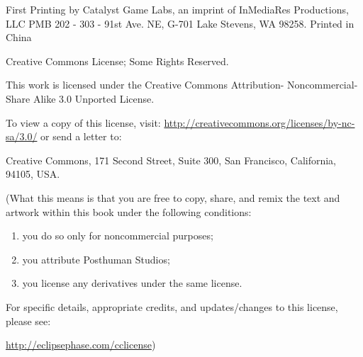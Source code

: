 First Printing by Catalyst Game Labs, an imprint of InMediaRes Productions, LLC PMB 202 - 303 - 91st Ave. NE, G-701 Lake Stevens, WA 98258. Printed in China 

Creative Commons License; Some Rights Reserved. 

This work is licensed under the Creative Commons Attribution- Noncommercial-Share Alike 3.0 Unported License. 

To view a copy of this license, visit: \url{http://creativecommons.org/licenses/by-nc-sa/3.0/}{} or send a letter to: 

\begin{center} Creative Commons, 171 Second Street, Suite 300, San Francisco, California, 94105, USA. \end{center} 

(What this means is that you are free to copy, share, and remix the text and artwork within this book under the following conditions: 

\begin{enumerate} \item you do so only for noncommercial purposes; \item you attribute Posthuman Studios; \item you license any derivatives under the same license. \end{enumerate} 

For specific details, appropriate credits, and updates/changes to this license, please see: 

\begin{center} \url{http://eclipsephase.com/cclicense}{}) \end{center} 











